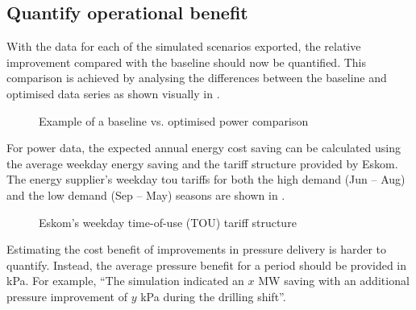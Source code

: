 	\subsection{Quantify operational benefit}
		With the data for each of the simulated scenarios exported, the relative improvement compared with the baseline should now be quantified. This comparison is achieved by analysing the differences between the baseline and optimised data series as shown visually in .
		\par 
		\begin{figure}[h]
			\centering
			
			\caption{Example of a baseline vs. optimised power comparison}
			\label{fig: Savings Power.}
		\end{figure} 
		\clearpage
		For power data, the expected annual energy cost saving can be calculated using the average weekday energy saving and the tariff structure provided by Eskom. The energy supplier's weekday \gls{tou} tariffs for both the high demand (Jun -- Aug) and the low demand (Sep -- May) seasons are shown in .
		\par 
		\begin{figure}[h]
			\centering
			
			\caption[Eskom's weekday TOU tariff structure]{Eskom's weekday time-of-use (TOU) tariff structure\protect \footnotemark[1]}
			\label{fig: Tariff}
		\end{figure}
		
		Estimating the cost benefit of improvements in pressure delivery is harder to quantify. Instead, the average pressure benefit for a period should be provided in kPa. For example, \enquote{The simulation indicated an $x$ MW saving with an additional pressure improvement of $y$ kPa during the drilling shift}.

